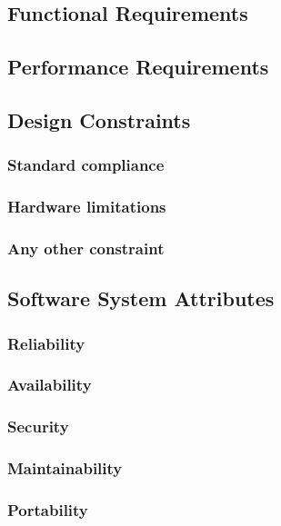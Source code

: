 \subsection{Functional Requirements}
\subsection{Performance Requirements}
\subsection{Design Constraints}
	\subsubsection{Standard compliance}
	\subsubsection{Hardware limitations}
	\subsubsection{Any other constraint}
\subsection{Software System Attributes} 
	\subsubsection{Reliability}
	\subsubsection{Availability}
	\subsubsection{Security}
	\subsubsection{Maintainability}
	\subsubsection{Portability}